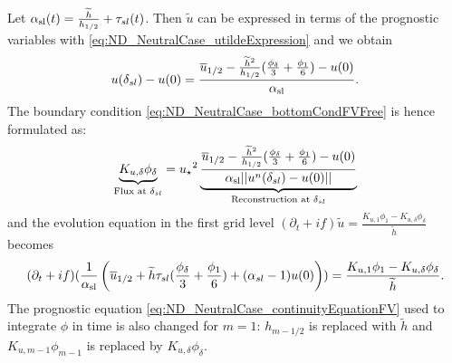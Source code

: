 Let $\alpha_{\rm sl}(t) = \frac{\widetilde{h}}{h_{1/2}}+\tau_{sl}(t)$.
Then $\widetilde{u}$ can be expressed in terms of the prognostic
variables with \eqref{eq:ND_NeutralCase_utildeExpression}
and we obtain
\begin{equation}
u(\delta_{sl})-u(0)=\frac{\overline{u}_{1/2} -
	\frac{\widetilde{h}^2}{h_{1/2}}
	(\frac{\phi_{\delta}}{3} + \frac{\phi_1}{6}) - u(0)}
	{\alpha_{\rm sl}}.
\end{equation}
The boundary condition \eqref{eq:ND_NeutralCase_bottomCondFVFree}
is hence formulated as:
\begin{equation}
	\label{eq:ND_NeutralCase_boundaryCondFVfree}
	\underbrace{K_{u,\delta} \phi_{\delta}}_{
		\text{Flux at } \delta_{sl}
	} = {u_\star}^2
	\underbrace{\frac{\overline{u}_{1/2} -
	\frac{\widetilde{h}^2}{h_{1/2}}
	(\frac{\phi_{\delta}}{3} + \frac{\phi_1}{6})-u(0)}
	{\alpha_{\rm sl}||u^n(\delta_{sl}) - u(0)||}}_{
		\text{Reconstruction at } \delta_{sl}
	}
\end{equation}
% 
and the evolution equation in the first grid level
$ (\partial_t+if) \widetilde{u}
= \frac{K_{u, 1}\phi_1 - K_{u,\delta} \phi_{\delta}}{\widetilde{h}}$
becomes
\begin{equation}
	\label{eq:ND_NeutralCase_semiDiscreteEkmanEqFVfree}
	(\partial_t+if) (\frac{1}{\alpha_{\rm sl}}
	\left(\overline{u}_{1/2} + \widetilde{h}\tau_{sl}
	(\frac{\phi_{\delta}}{3} + \frac{\phi_1}{6})
	+ (\alpha_{sl} - 1) u(0)
	\right))
	= \frac{K_{u, 1}\phi_1 - K_{u,\delta} \phi_{\delta}}{\widetilde{h}}.
\end{equation}
The prognostic equation \eqref{eq:ND_NeutralCase_continuityEquationFV}
used to integrate $\phi$ in time
is also changed for $m=1$: $h_{m-1/2}$ is replaced
with $\widetilde{h}$ and $K_{u, m-1}\phi_{m-1}$ is replaced by
$K_{u,\delta}\phi_{\delta}$.
